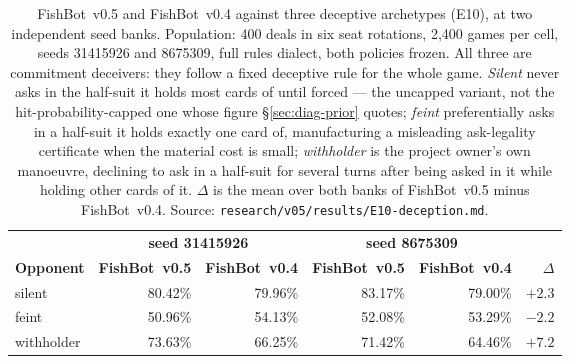 \documentclass[11pt]{article}
\theoremstyle{definition}
\DeclareRobustCommand{\vfive}{\texorpdfstring{\mbox{FishBot v0.5}}{FishBot v0.5}}
\DeclareRobustCommand{\vfour}{\texorpdfstring{\mbox{FishBot v0.4}}{FishBot v0.4}}
\providecommand{\numDecGames}{2{,}400}
\providecommand{\numDecSilentDelta}{+2.3}
\providecommand{\numDecFeintDelta}{-2.2}
\providecommand{\numDecWithholderDelta}{+7.2}
\providecommand{\numDecDeals}{400}
\providecommand{\numDecFeintFiveA}{50.96}
\providecommand{\numDecFeintFiveB}{52.08}
\providecommand{\numDecFeintFourA}{54.13}
\providecommand{\numDecFeintFourB}{53.29}
\providecommand{\numDecSeedA}{31415926}
\providecommand{\numDecSeedB}{8675309}
\providecommand{\numDecSilentFiveA}{80.42}
\providecommand{\numDecSilentFiveB}{83.17}
\providecommand{\numDecSilentFourA}{79.96}
\providecommand{\numDecSilentFourB}{79.00}
\providecommand{\numDecWithholderFiveA}{73.63}
\providecommand{\numDecWithholderFiveB}{71.42}
\providecommand{\numDecWithholderFourA}{66.25}
\providecommand{\numDecWithholderFourB}{64.46}
\begin{document}
\begin{table}[t]
\centering
\caption{\vfive{} and \vfour{} against three deceptive archetypes (E10), at two
independent seed banks. Population: \numDecDeals{} deals in six seat rotations,
\numDecGames{} games per cell, seeds \numDecSeedA{} and \numDecSeedB{}, full
rules dialect, both policies frozen. All three are commitment deceivers: they
follow a fixed deceptive rule for the whole game. \emph{Silent} never asks in the
half-suit it holds most cards of until forced --- the uncapped variant, not the
hit-probability-capped one whose figure \S\ref{sec:diag-prior} quotes;
\emph{feint} preferentially asks in a half-suit it holds exactly one card of,
manufacturing a misleading ask-legality certificate when the material cost is
small; \emph{withholder} is the project owner's own manoeuvre, declining to ask in
a half-suit for several turns after being asked in it while holding other cards of
it. $\Delta$ is the mean over both banks of \vfive{} minus \vfour{}. Source:
\texttt{research/v05/results/E10-deception.md}.}
\label{tab:deception}
\small
\begin{tabular}{lrrrrr}
\toprule
& \multicolumn{2}{c}{\textbf{seed \numDecSeedA{}}} & \multicolumn{2}{c}{\textbf{seed \numDecSeedB{}}} & \\
\cmidrule(lr){2-3}\cmidrule(lr){4-5}
\textbf{Opponent} & \textbf{\vfive{}} & \textbf{\vfour{}} & \textbf{\vfive{}} & \textbf{\vfour{}} & \textbf{$\Delta$} \\
\midrule
silent      & \numDecSilentFiveA\%      & \numDecSilentFourA\%      & \numDecSilentFiveB\%      & \numDecSilentFourB\%      & $\numDecSilentDelta$ \\
feint       & \numDecFeintFiveA\%       & \numDecFeintFourA\%       & \numDecFeintFiveB\%       & \numDecFeintFourB\%       & $\numDecFeintDelta$ \\
withholder  & \numDecWithholderFiveA\%  & \numDecWithholderFourA\%  & \numDecWithholderFiveB\%  & \numDecWithholderFourB\%  & $\numDecWithholderDelta$ \\
\bottomrule
\end{tabular}
\end{table}
\end{document}
